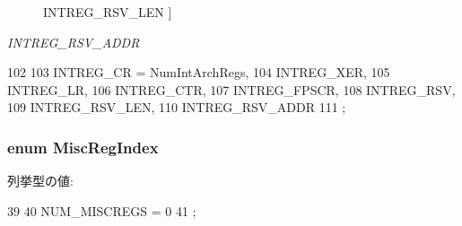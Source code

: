\begin{Desc}
\begin{description}
{\hypertarget{namespacePowerISA_a9969c99e14b7b491ae9e3751404cc6a1a0d4c3467b31d839eddc5fee40218ae58}{
INTREG\_\-RSV\_\-LEN}
\label{namespacePowerISA_a9969c99e14b7b491ae9e3751404cc6a1a0d4c3467b31d839eddc5fee40218ae58}
}]\item[{\em 
\hypertarget{namespacePowerISA_a9969c99e14b7b491ae9e3751404cc6a1a5872a0b2feef4ede9d5614db9649c648}{
INTREG\_\-RSV\_\-ADDR}
\label{namespacePowerISA_a9969c99e14b7b491ae9e3751404cc6a1a5872a0b2feef4ede9d5614db9649c648}
}]\end{description}
\end{Desc}




\begin{DoxyCode}
102                     {
103     INTREG_CR = NumIntArchRegs,
104     INTREG_XER,
105     INTREG_LR,
106     INTREG_CTR,
107     INTREG_FPSCR,
108     INTREG_RSV,
109     INTREG_RSV_LEN,
110     INTREG_RSV_ADDR
111 };
\end{DoxyCode}
\hypertarget{namespacePowerISA_a1e522017e015d4c7efd6b2360143aa67}{
\subsubsection[{MiscRegIndex}]{\setlength{\rightskip}{0pt plus 5cm}enum {\bf MiscRegIndex}}}
\label{namespacePowerISA_a1e522017e015d4c7efd6b2360143aa67}
\begin{Desc}
\item[列挙型の値: ]\par
\begin{description}
\item[{\em 
\hypertarget{namespacePowerISA_a1e522017e015d4c7efd6b2360143aa67a7d1d86545746c83e719e24556985648a}{
NUM\_\-MISCREGS}
\label{namespacePowerISA_a1e522017e015d4c7efd6b2360143aa67a7d1d86545746c83e719e24556985648a}
}]\end{description}
\end{Desc}




\begin{DoxyCode}
39                   {
40     NUM_MISCREGS = 0
41 };
\end{DoxyCode}


